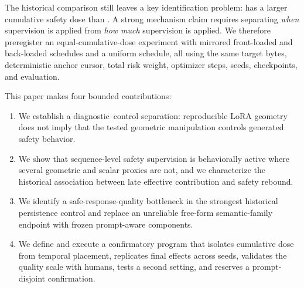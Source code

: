 The historical comparison still leaves a key identification problem: \constanttwenty{} has a larger cumulative safety dose than \decayten{}. A strong mechanism claim requires separating \emph{when} supervision is applied from \emph{how much} supervision is applied. We therefore preregister an equal-cumulative-dose experiment with mirrored front-loaded and back-loaded schedules and a uniform schedule, all using the same target bytes, deterministic anchor cursor, total risk weight, optimizer steps, seeds, checkpoints, and evaluation.

This paper makes four bounded contributions:

\begin{enumerate}[leftmargin=*]
  \item We establish a diagnostic--control separation: reproducible LoRA geometry does not imply that the tested geometric manipulation controls generated safety behavior.
  \item We show that sequence-level safety supervision is behaviorally active where several geometric and scalar proxies are not, and we characterize the historical association between late effective contribution and safety rebound.
  \item We identify a safe-response-quality bottleneck in the strongest historical persistence control and replace an unreliable free-form semantic-family endpoint with frozen prompt-aware components.
  \item We define and execute a confirmatory program that isolates cumulative dose from temporal placement, replicates final effects across seeds, validates the quality scale with humans, tests a second setting, and reserves a prompt-disjoint confirmation. 
\end{enumerate}

